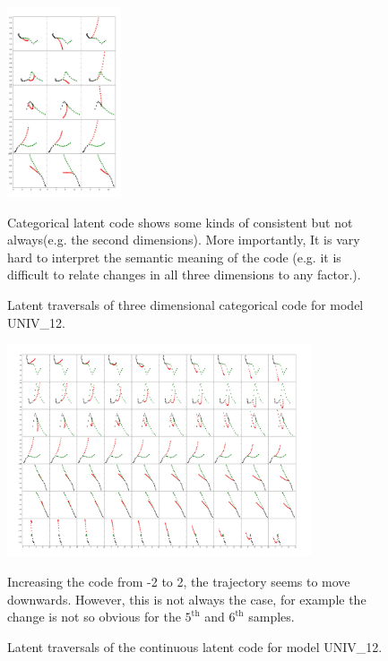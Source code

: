 \begin{figure}[b]
  \centering
  \includegraphics[width=0.3\textwidth]{figures/disc_interpolations_code0_batch2.jpeg}
  \caption{Latent traversals of three dimensional categorical code for model UNIV\_12. }{Categorical latent code shows some kinds of consistent but not always(e.g. the second dimensions). More importantly, It is vary hard to  interpret the semantic meaning of the code (e.g. it is difficult to relate changes in all three dimensions to any factor.).}
  \label{disc_code}
\end{figure}

\begin{figure}[ht]
  \centering
  \includegraphics[width=0.8\textwidth]{figures/cont_interpolations_code0_batch2.jpeg}
  \caption{Latent traversals of the continuous latent code for model UNIV\_12. }{Increasing the code from -2 to 2, the trajectory seems to move downwards. However, this is not always the case, for example the change is not so obvious for the $5^{\text{th}}$ and $6^{\text{th}}$ samples.}
  \label{cont_code}
\end{figure}

